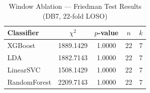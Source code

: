 \begin{table}[htbp]
\centering
\caption{Window Ablation --- Friedman Test Results (DB7, 22-fold LOSO)}
\label{tab:window_stats}
\begin{tabular}{lcccc}
\toprule
Classifier & $\chi^2$ & $p$-value & $n$ & $k$ \\
\midrule
XGBoost & 1889.1429 & 1.0000 & 22 & 7 \\
LDA & 1882.7143 & 1.0000 & 22 & 7 \\
LinearSVC & 1508.1429 & 1.0000 & 22 & 7 \\
RandomForest & 2209.7143 & 1.0000 & 22 & 7 \\
\bottomrule
\end{tabular}
\end{table}
